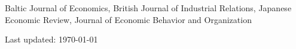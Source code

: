 \documentclass[11pt, a4paper]{article} %
\begin{document}
Baltic Journal of Economics, British Journal of Industrial Relations, Japanese Economic Review, Journal of Economic Behavior and Organization


\vfill{} %


\begin{center}
{\scriptsize Last updated: \today} %
\end{center}

\end{document}

